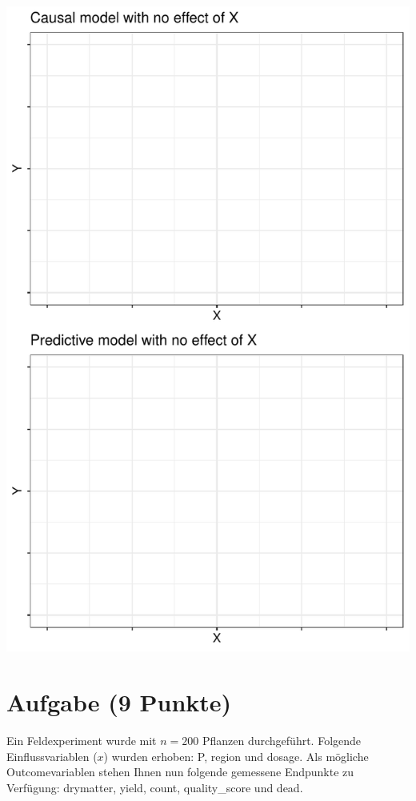 \documentclass[a4paper, 10pt]{scrartcl}\usepackage[]{graphicx}\usepackage[]{color}
\makeatletter
\def\maxwidth{ %
  \ifdim\Gin@nat@width>\linewidth
    \linewidth
  \else
    \Gin@nat@width
  \fi
}
\makeatother
\begin{document}
{\centering \includegraphics[width=\maxwidth]{img/modeling-01-1} 

}



 
\clearpage

\section{Aufgabe \hfill (9 Punkte)}



Ein Feldexperiment wurde mit $n = 200$ Pflanzen durchgef{\"u}hrt. Folgende
Einflussvariablen ($x$) wurden erhoben: P, region und dosage. Als m{\"o}gliche Outcomevariablen stehen Ihnen nun
folgende gemessene Endpunkte zu Verf{\"u}gung: drymatter, yield, count, quality\_score und dead.
\end{document}
